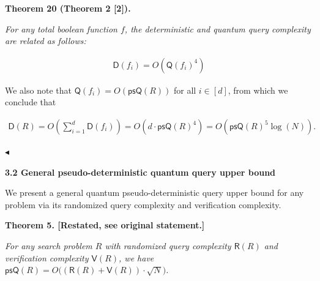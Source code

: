 \documentclass[10pt,a4paper]{article}
\begin{document}
\par\medskip\noindent\textbf{
\textbf{Theorem 20}\textbf{ }(Theorem 2 [2])\textbf{.}
}\par



\emph{For any total boolean function $f$, the deterministic and quantum query complexity are related as follows:}\par


\[\begin{gathered}
\mathsf{D}(f_{i})=O(\mathsf{Q}(f_{i})^{4})
\end{gathered}\]






We also note that $\mathsf{Q}(f_{i})=O(\mathsf{psQ}(R))$ for all $i\in[d]$, from which we conclude that\par


\[\begin{gathered}
\mathsf{D}(R)=O\left(\sum_{i=1}^{d}\mathsf{D}(f_{i})\right)=O(d\cdot\mathsf{psQ}(R)^{4})=O(\mathsf{psQ}({R})^{5}\log(N)).\
\end{gathered}\]


$\blacktriangleleft$\par






\par\medskip\noindent\textbf{
3.2 General pseudo-deterministic quantum query upper bound}\par




We present a general quantum pseudo-deterministic query upper bound for any problem via its randomized query complexity and verification complexity.\par






\par\medskip\noindent\textbf{
\textbf{Theorem 5}\textbf{.}
[Restated, see original statement.]}\par



\emph{For any search problem ${R}$ with randomized query complexity $\mathsf{R}(R)$ and verification complexity $\mathsf{V}(R)$, we have $\mathsf{psQ}(R)=O\big((\mathsf{R}(R)+\mathsf{V}(R))\cdot\sqrt{N}\big)$.}\par
\end{document}
